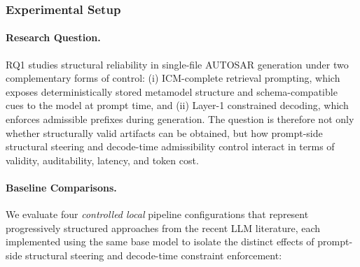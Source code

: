 \documentclass[acmlarge,nonacm]{acmart}
\theoremstyle{acmplain}
\theoremstyle{acmdefinition}
\begin{document}
\subsubsection{Experimental Setup}
\label{sec:rq1-setup}

\paragraph{Research Question.} RQ1 studies structural reliability in single-file AUTOSAR generation under two complementary forms of control: (i) ICM-complete retrieval prompting, which exposes deterministically stored metamodel structure and schema-compatible cues to the model at prompt time, and (ii) Layer-1 constrained decoding, which enforces admissible prefixes during generation. The question is therefore not only whether structurally valid artifacts can be obtained, but how prompt-side structural steering and decode-time admissibility control interact in terms of validity, auditability, latency, and token cost.

\paragraph{Baseline Comparisons.} We evaluate four \emph{controlled local} pipeline configurations that represent progressively structured approaches from the recent LLM literature, each implemented using the same base model to isolate the distinct effects of prompt-side structural steering and decode-time constraint enforcement:
\end{document}
